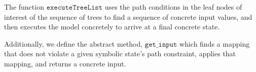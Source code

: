 The function $\mathtt{executeTreeList}$ uses the
    path conditions in the leaf nodes of interest of the sequence of trees to find a
    sequence of concrete input values, and then executes the model concretely to
    arrive at a final concrete state.

Additionally, we define the abstract method, $ \mathtt{get\_input}$ which finds a mapping that does not violate a given symbolic state's path constraint, applies that mapping, and returns a concrete input.




